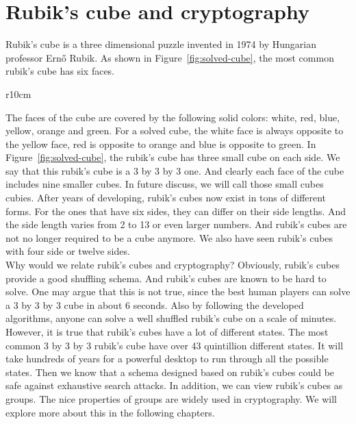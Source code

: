 \section{Rubik's cube and cryptography}
Rubik's cube is a three dimensional puzzle invented in 1974 by Hungarian professor Ernő Rubik. As shown in Figure~\ref{fig:solved-cube}, the most common rubik's cube has six faces.
\begin{wrapfigure}{r}{10cm}
\centering
\RubikCubeSolved{}
\caption{A rubik's cube at the solved state.}\label{fig:solved-cube}
\end{wrapfigure}
The faces of the cube are covered by the following solid colors: white, red, blue, yellow, orange and green. For a solved cube, the white face is always opposite to the yellow face, red is opposite to orange and blue is opposite to green. In Figure~\ref{fig:solved-cube}, the rubik's cube has three small cube on each side. We say that this rubik's cube is a 3 by 3 by 3 one. And clearly each face of the cube includes nine smaller cubes. In future discuss, we will call those small cubes cubies. After years of developing, rubik's cubes now exist in tons of different forms. For the ones that have six sides, they can differ on their side lengths. And the side length varies from 2 to 13 or even larger numbers. And rubik's cubes are not no longer required to be a cube anymore. We also have seen rubik's cubes with four side or twelve sides. \\
Why would we relate rubik's cubes and cryptography? Obviously, rubik's cubes provide a good shuffling schema. And rubik's cubes are known to be hard to solve. One may argue that this is not true, since the best human players can solve a 3 by 3 by 3 cube in about 6 seconds. Also by following the developed algorithms, anyone can solve a well shuffled rubik's cube on a scale of minutes. However, it is true that rubik's cubes have a lot of different states. The most common 3 by 3 by 3 rubik's cube have over 43 quintillion different states. It will take hundreds of years for a powerful desktop to run through all the possible states. Then we know that a schema designed based on rubik's cubes could be safe against exhaustive search attacks. In addition, we can view rubik's cubes as groups. The nice properties of groups are widely used in cryptography. We will explore more about this in the following chapters.


